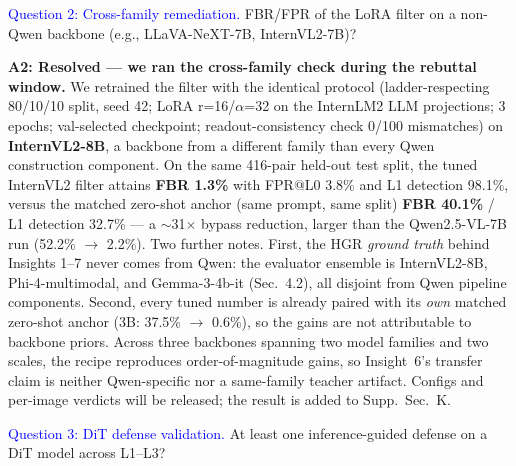 \textcolor{blue}{Question 2: Cross-family remediation.} FBR/FPR of the LoRA filter on a non-Qwen backbone (e.g., LLaVA-NeXT-7B, InternVL2-7B)?

\textbf{A2: Resolved --- we ran the cross-family check during the rebuttal window.}
We retrained the filter with the identical protocol (ladder-respecting 80/10/10 split, seed 42; LoRA r=16/$\alpha$=32 on the InternLM2 LLM projections; 3 epochs; val-selected checkpoint; readout-consistency check 0/100 mismatches) on \textbf{InternVL2-8B}, a backbone from a different family than every Qwen construction component. On the same 416-pair held-out test split, the tuned InternVL2 filter attains \textbf{FBR 1.3\%} with FPR@L0 3.8\% and L1 detection 98.1\%, versus the matched zero-shot anchor (same prompt, same split) \textbf{FBR 40.1\%} / L1 detection 32.7\% --- a $\sim$31$\times$ bypass reduction, larger than the Qwen2.5-VL-7B run (52.2\% $\to$ 2.2\%).
Two further notes. First, the HGR \emph{ground truth} behind Insights 1--7 never comes from Qwen: the evaluator ensemble is InternVL2-8B, Phi-4-multimodal, and Gemma-3-4b-it (Sec.~4.2), all disjoint from Qwen pipeline components. Second, every tuned number is already paired with its \emph{own} matched zero-shot anchor (3B: 37.5\% $\to$ 0.6\%), so the gains are not attributable to backbone priors. Across three backbones spanning two model families and two scales, the recipe reproduces order-of-magnitude gains, so Insight~6's transfer claim is neither Qwen-specific nor a same-family teacher artifact. Configs and per-image verdicts will be released; the result is added to Supp.~Sec.~K.

\textcolor{blue}{Question 3: DiT defense validation.} At least one inference-guided defense on a DiT model across L1--L3?

